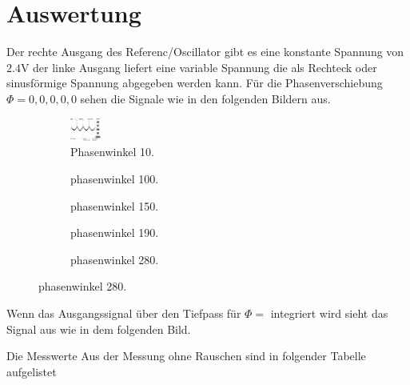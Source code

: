 \section{Auswertung}
\label{sec:Auswertung}
Der rechte Ausgang des Referenc/Oscillator gibt es eine konstante Spannung
von $2.4\si{\volt}$ der linke Ausgang liefert eine variable Spannung die
als Rechteck oder sinusförmige Spannung abgegeben werden kann. Für die
Phasenverschiebung $\Phi=0,0,0,0,0$ sehen die Signale wie in den folgenden
Bildern aus.
\begin{figure}
  \centering
  \begin{subfigure}{0.48\textwidth}
    \centering
    \includegraphics[height=0.75cm]{Bilder/or/or10.JPG}
    \caption{Phasenwinkel 10.}
    \label{fig:or10}
  \end{subfigure}
  \begin{subfigure}{0.48\textwidth}
    \centering
    \caption{phasenwinkel 100.}
    \label{fig:pep2}
  \end{subfigure}  \centering
    \begin{subfigure}{0.48\textwidth}
      \centering
      \caption{phasenwinkel 150.}
      \label{fig:pep2}
    \end{subfigure}
  \centering
  \begin{subfigure}{0.48\textwidth}
    \centering
    \caption{phasenwinkel 190.}
    \label{fig:pep2}
  \end{subfigure}
  \begin{subfigure}{0.48\textwidth}
    \centering
    \caption{phasenwinkel 280.}
    \label{fig:pep2}
  \end{subfigure}
\end{figure}
Wenn das Ausgangssignal über den Tiefpass für $\Phi=$ integriert wird sieht das
Signal aus wie in dem folgenden Bild.
\begin{figure}

\end{figure}
Die Messwerte Aus der Messung ohne Rauschen sind in folgender Tabelle aufgelistet
